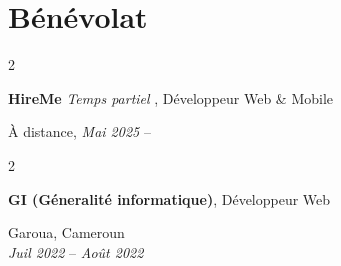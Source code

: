 \documentclass[10pt, letterpaper]{article}
\newenvironment{highlights}{
	\begin{itemize}[
		topsep=0.10 cm,
		parsep=0.10 cm,
		partopsep=0pt,
		itemsep=0pt,
		leftmargin=0.4 cm + 10pt
		]
	}{
	\end{itemize}
} %
\newenvironment{twocolentry}[2][]{
	\onecolentry
	\def\secondColumn{#2}
	\setcolumnwidth{\fill, 4.5 cm} %
	\begin{paracol}{2}
	}{
		\switchcolumn \raggedleft \secondColumn
	\end{paracol}
	\endonecolentry
} %
\begin{document}
	\section{Bénévolat}
	\begin{twocolentry}{À distance, \textit{Mai 2025} – }
		\textbf{HireMe} \textit{Temps partiel} , Développeur Web \& Mobile
	\end{twocolentry}
	\vspace{0.2 cm}
	\begin{twocolentry}{Garoua, Cameroun\\ \textit{Juil 2022} – \textit{Août 2022}}
		\textbf{GI (Géneralité informatique)}, Développeur Web
	\end{twocolentry}
\end{document}
